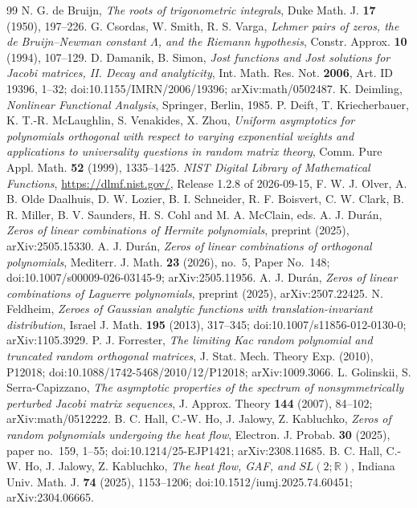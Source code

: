 \documentclass[11pt]{amsart}
\theoremstyle{definition}
\theoremstyle{remark}
\numberwithin{equation}{section}
\begin{document}
\begin{thebibliography}{99}
 N. G. de Bruijn, \emph{The roots of trigonometric integrals}, Duke Math. J. \textbf{17} (1950), 197--226.
 G. Csordas, W. Smith, R. S. Varga, \emph{Lehmer pairs of zeros, the de Bruijn--Newman constant $\Lambda$, and the Riemann hypothesis}, Constr. Approx. \textbf{10} (1994), 107--129.
 D. Damanik, B. Simon, \emph{Jost functions and Jost solutions for Jacobi matrices, II. Decay and analyticity}, Int. Math. Res. Not. \textbf{2006}, Art. ID 19396, 1--32; doi:10.1155/IMRN/2006/19396; arXiv:math/0502487.
 K. Deimling, \emph{Nonlinear Functional Analysis}, Springer, Berlin, 1985.
 P. Deift, T. Kriecherbauer, K. T.-R. McLaughlin, S. Venakides, X. Zhou, \emph{Uniform asymptotics for polynomials orthogonal with respect to varying exponential weights and applications to universality questions in random matrix theory}, Comm. Pure Appl. Math. \textbf{52} (1999), 1335--1425.
 \emph{NIST Digital Library of Mathematical Functions}, \url{https://dlmf.nist.gov/}, Release 1.2.8 of 2026-09-15, F. W. J. Olver, A. B. Olde Daalhuis, D. W. Lozier, B. I. Schneider, R. F. Boisvert, C. W. Clark, B. R. Miller, B. V. Saunders, H. S. Cohl and M. A. McClain, eds.
 A. J. Dur\'an, \emph{Zeros of linear combinations of Hermite polynomials}, preprint (2025), arXiv:2505.15330.
 A. J. Dur\'an, \emph{Zeros of linear combinations of orthogonal polynomials}, Mediterr. J. Math. \textbf{23} (2026), no.~5, Paper No.~148; doi:10.1007/s00009-026-03145-9; arXiv:2505.11956.
 A. J. Dur\'an, \emph{Zeros of linear combinations of Laguerre polynomials}, preprint (2025), arXiv:2507.22425.
 N. Feldheim, \emph{Zeroes of Gaussian analytic functions with translation-invariant distribution}, Israel J. Math. \textbf{195} (2013), 317--345; doi:10.1007/s11856-012-0130-0; arXiv:1105.3929.
 P. J. Forrester, \emph{The limiting Kac random polynomial and truncated random orthogonal matrices}, J. Stat. Mech. Theory Exp. (2010), P12018; doi:10.1088/1742-5468/2010/12/P12018; arXiv:1009.3066.
 L. Golinskii, S. Serra-Capizzano, \emph{The asymptotic properties of the spectrum of nonsymmetrically perturbed Jacobi matrix sequences}, J. Approx. Theory \textbf{144} (2007), 84--102; arXiv:math/0512222.
 B. C. Hall, C.-W. Ho, J. Jalowy, Z. Kabluchko, \emph{Zeros of random polynomials undergoing the heat flow}, Electron. J. Probab. \textbf{30} (2025), paper no.~159, 1--55; doi:10.1214/25-EJP1421; arXiv:2308.11685.
 B. C. Hall, C.-W. Ho, J. Jalowy, Z. Kabluchko, \emph{The heat flow, GAF, and $SL(2;\mathbb R)$}, Indiana Univ. Math. J. \textbf{74} (2025), 1153--1206; doi:10.1512/iumj.2025.74.60451; arXiv:2304.06665.

\end{thebibliography}
\end{document}

